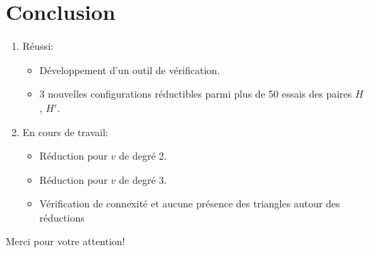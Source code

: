 \documentclass{beamer}
\begin{document}

\section{Conclusion}
\begin{frame}
\begin{enumerate}
\item Réussi:
\begin{itemize}
\item Développement d'un outil de vérification.
\item 3 nouvelles configurations réductibles parmi plus de 50 essais des paires $H$, $H'$.
\end{itemize}
\item En cours de travail:
\begin{itemize}
\item Réduction pour $v$ de degré 2.
\item Réduction pour $v$ de degré 3.
\item Vérification de connexité et aucune présence des triangles autour des réductions
\end{itemize}
\end{enumerate}

\end{frame}

\begin{frame}
\begin{center}
Merci pour votre attention!
\end{center}
\end{frame}
\end{document}
